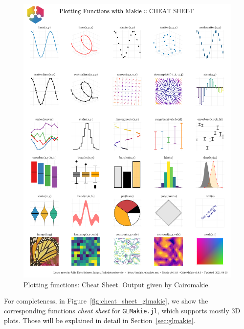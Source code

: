 \documentclass[
  notoc %
]{tufte-book}
\newcommand{\passthrough}[1]{#1}
\begin{document}
\begin{figure}
\hypertarget{fig:cheat_sheet_cairomakie}{%
\centering
\includegraphics{images/makiePlottingFunctionsHide.png}
\caption{Plotting functions: Cheat Sheet. Output given by
Cairomakie.}\label{fig:cheat_sheet_cairomakie}
}
\end{figure}

For completeness, in Figure~\ref{fig:cheat_sheet_glmakie}, we show the
corresponding functions \emph{cheat sheet} for
\passthrough{\lstinline!GLMakie.jl!}, which supports mostly 3D plots.
Those will be explained in detail in Section~\ref{sec:glmakie}.
\end{document}
